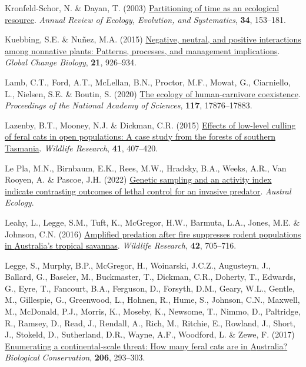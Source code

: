 \documentclass[11pt,a4paper,titlepage,twoside,openright]{style/unimelbthesis}
\newenvironment{CSLReferences}%
  {}%
  {\par}
\begin{document}
\begin{mainmatter}
\begin{CSLReferences}{1}{0}
\leavevmode{}%
Kronfeld-Schor, N. \& Dayan, T. (2003) \href{https://doi.org/10.1146/annurev.ecolsys.34.011802.132435}{Partitioning of time as an ecological resource}. \emph{Annual Review of Ecology, Evolution, and Systematics}, \textbf{34}, 153--181.

\leavevmode{}%
Kuebbing, S.E. \& Nuñez, M.A. (2015) \href{https://doi.org/10.1111/gcb.12711}{Negative, neutral, and positive interactions among nonnative plants: Patterns, processes, and management implications}. \emph{Global Change Biology}, \textbf{21}, 926--934.

\leavevmode{}%
Lamb, C.T., Ford, A.T., McLellan, B.N., Proctor, M.F., Mowat, G., Ciarniello, L., Nielsen, S.E. \& Boutin, S. (2020) \href{https://doi.org/10.1073/pnas.1922097117}{The ecology of human-carnivore coexistence}. \emph{Proceedings of the National Academy of Sciences}, \textbf{117}, 17876--17883.

\leavevmode{}%
Lazenby, B.T., Mooney, N.J. \& Dickman, C.R. (2015) \href{https://doi.org/10.1071/WR14030}{Effects of low-level culling of feral cats in open populations: A case study from the forests of southern {T}asmania}. \emph{Wildlife Research}, \textbf{41}, 407--420.

\leavevmode{}%
Le Pla, M.N., Birnbaum, E.K., Rees, M.W., Hradsky, B.A., Weeks, A.R., Van Rooyen, A. \& Pascoe, J.H. (2022) \href{https://doi.org/10.1111/aec.13182}{Genetic sampling and an activity index indicate contrasting outcomes of lethal control for an invasive predator}. \emph{Austral Ecology}.

\leavevmode{}%
Leahy, L., Legge, S.M., Tuft, K., McGregor, H.W., Barmuta, L.A., Jones, M.E. \& Johnson, C.N. (2016) \href{https://doi.org/10.1071/WR15011}{Amplified predation after fire suppresses rodent populations in {A}ustralia's tropical savannas}. \emph{Wildlife Research}, \textbf{42}, 705--716.

\leavevmode{}%
Legge, S., Murphy, B.P., McGregor, H., Woinarski, J.C.Z., Augusteyn, J., Ballard, G., Baseler, M., Buckmaster, T., Dickman, C.R., Doherty, T., Edwards, G., Eyre, T., Fancourt, B.A., Ferguson, D., Forsyth, D.M., Geary, W.L., Gentle, M., Gillespie, G., Greenwood, L., Hohnen, R., Hume, S., Johnson, C.N., Maxwell, M., McDonald, P.J., Morris, K., Moseby, K., Newsome, T., Nimmo, D., Paltridge, R., Ramsey, D., Read, J., Rendall, A., Rich, M., Ritchie, E., Rowland, J., Short, J., Stokeld, D., Sutherland, D.R., Wayne, A.F., Woodford, L. \& Zewe, F. (2017) \href{https://doi.org/10.1016/j.biocon.2016.11.032}{Enumerating a continental-scale threat: How many feral cats are in {A}ustralia?} \emph{Biological Conservation}, \textbf{206}, 293--303.


\end{CSLReferences}
\end{mainmatter}
\end{document}
